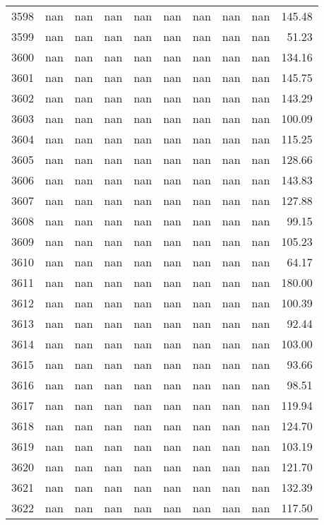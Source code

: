 \begin{tabular}{lrrrrrrrrr}
3598 & nan & nan & nan & nan & nan & nan & nan & nan & 145.48 \\
3599 & nan & nan & nan & nan & nan & nan & nan & nan & 51.23 \\
3600 & nan & nan & nan & nan & nan & nan & nan & nan & 134.16 \\
3601 & nan & nan & nan & nan & nan & nan & nan & nan & 145.75 \\
3602 & nan & nan & nan & nan & nan & nan & nan & nan & 143.29 \\
3603 & nan & nan & nan & nan & nan & nan & nan & nan & 100.09 \\
3604 & nan & nan & nan & nan & nan & nan & nan & nan & 115.25 \\
3605 & nan & nan & nan & nan & nan & nan & nan & nan & 128.66 \\
3606 & nan & nan & nan & nan & nan & nan & nan & nan & 143.83 \\
3607 & nan & nan & nan & nan & nan & nan & nan & nan & 127.88 \\
3608 & nan & nan & nan & nan & nan & nan & nan & nan & 99.15 \\
3609 & nan & nan & nan & nan & nan & nan & nan & nan & 105.23 \\
3610 & nan & nan & nan & nan & nan & nan & nan & nan & 64.17 \\
3611 & nan & nan & nan & nan & nan & nan & nan & nan & 180.00 \\
3612 & nan & nan & nan & nan & nan & nan & nan & nan & 100.39 \\
3613 & nan & nan & nan & nan & nan & nan & nan & nan & 92.44 \\
3614 & nan & nan & nan & nan & nan & nan & nan & nan & 103.00 \\
3615 & nan & nan & nan & nan & nan & nan & nan & nan & 93.66 \\
3616 & nan & nan & nan & nan & nan & nan & nan & nan & 98.51 \\
3617 & nan & nan & nan & nan & nan & nan & nan & nan & 119.94 \\
3618 & nan & nan & nan & nan & nan & nan & nan & nan & 124.70 \\
3619 & nan & nan & nan & nan & nan & nan & nan & nan & 103.19 \\
3620 & nan & nan & nan & nan & nan & nan & nan & nan & 121.70 \\
3621 & nan & nan & nan & nan & nan & nan & nan & nan & 132.39 \\
3622 & nan & nan & nan & nan & nan & nan & nan & nan & 117.50 \\

\end{tabular}
